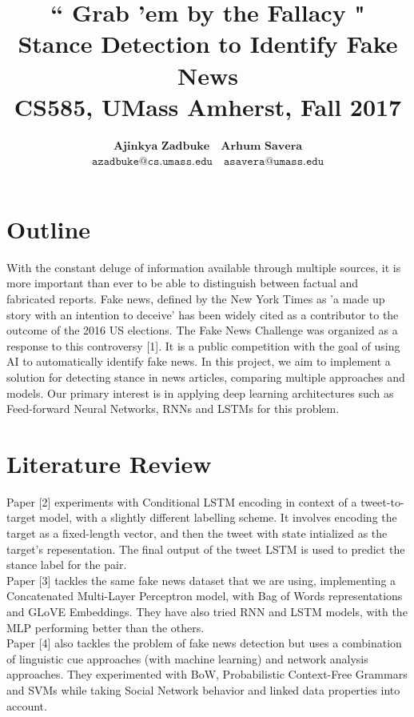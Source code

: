 \documentclass[11pt]{extarticle}
\title{\textbf{`` Grab 'em by the Fallacy "\\Stance Detection to Identify Fake News \\
  \large CS585, UMass Amherst, Fall 2017}}
\author{
$\textbf{Ajinkya Zadbuke}\quad\textbf{Arhum Savera}$\\
$\texttt{azadbuke@cs.umass.edu}\quad\texttt{asavera@umass.edu}$}
\date{}
\begin{document}
\maketitle

\section{Outline}
With the constant deluge of information available through multiple sources, it is more important than ever to be able to distinguish between factual and fabricated reports. Fake news, defined by the New York Times as 'a made up story with an intention to deceive' has been widely cited as a contributor to the outcome of the 2016 US elections. The Fake News Challenge was organized as a response to this controversy [1]. It is a public competition with the goal of using AI to automatically identify fake news. In this project, we aim to implement a solution for detecting stance in news articles, comparing multiple approaches and models. Our primary interest is in applying deep learning architectures such as Feed-forward Neural Networks, RNNs and LSTMs for this problem.

\section{Literature Review}

Paper [2] experiments with Conditional LSTM encoding in context of a tweet-to-target model, with a slightly different labelling scheme. It involves encoding the target as a fixed-length vector, and then the tweet with state intialized as the target’s repesentation. The final output of the tweet LSTM is used to predict the stance label for the pair.\\


Paper [3] tackles the same fake news dataset that we are using, implementing a Concatenated Multi-Layer Perceptron model, with Bag of Words representations and GLoVE Embeddings. They have also tried RNN and LSTM models, with the MLP performing better than the others.\\

Paper [4] also tackles the problem of fake news detection but uses a combination of linguistic cue approaches (with machine learning) and network analysis approaches. They experimented with BoW, Probabilistic Context-Free Grammars and SVMs while taking Social Network behavior and linked data properties into account.\\
\end{document}
